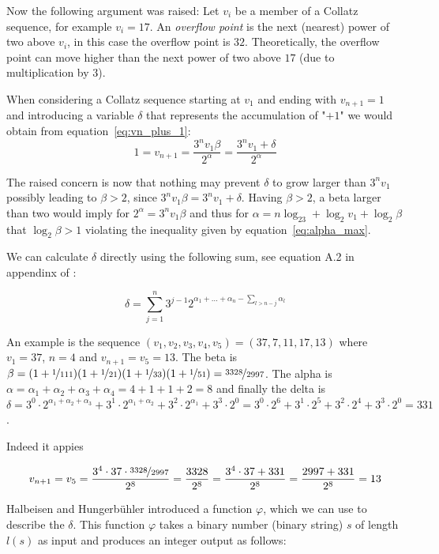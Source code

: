 \documentclass[12pt]{amsart}
\theoremstyle{definition}
\begin{document}
Now the following argument was raised: Let $v_i$ be a member of a Collatz sequence, for example $v_i=17$. An \textit{overflow point} is the next (nearest) power of two above $v_i$, in this case the overflow point is $32$. Theoretically, the overflow point can move higher than the next power of two above $17$ (due to multiplication by $3$).

When considering a Collatz sequence starting at $v_1$ and ending with $v_{n+1}=1$ and introducing a variable $\delta$ that represents the accumulation of "$+1$" we would obtain from equation~\ref{eq:vn_plus_1}:
\[
1=v_{n+1}=\frac{3^nv_1\beta}{2^{\alpha}}=\frac{3^nv_1+\delta}{2^{\alpha}}
\]

\par\medskip
The raised concern is now that nothing may prevent $\delta$ to grow larger than $3^nv_1$ possibly leading to $\beta>2$, since ${3^nv_1 \beta}={3^nv_1+\delta}$. Having $\beta>2$, a beta larger than two  would imply for $2^{\alpha}=3^nv_1\beta$ and thus for $\alpha=n\log_23+\log_2v_1+\log_2\beta$ that $\log_2\beta>1$ violating the inequality given by equation~\ref{eq:alpha_max}.

We can calculate $\delta$ directly using the following sum, see equation A.2 in appendinx of \cite[p.~36]{Sultanow_Koch_2020}:

\begin{equation}
\label{eq:delta}
\delta=\sum_{j=1}^{n}3^{j-1}2^{\alpha_1+\ldots+\alpha_n-\sum_{l>n-j}\alpha_l}
\end{equation}

An example is the sequence $(v_1,v_2,v_3,v_4,v_5)=(37,7,11,17,13)$ where $v_1=37$, $n=4$ and $v_{n+1}=v_5=13$. The beta is $\beta=(1+\nicefrac{1}{111})(1+\nicefrac{1}{21})(1+\nicefrac{1}{33})(1+\nicefrac{1}{51})=\nicefrac{3328}{2997}$. The alpha is $\alpha=\alpha_1+\alpha_2+\alpha_3+\alpha_4=4+1+1+2=8$ and finally the delta is $\delta=3^0\cdot2^{\alpha_1+\alpha_2+\alpha_3}+3^1\cdot2^{\alpha_1+\alpha_2}+3^2\cdot2^{\alpha_1}+3^3\cdot2^0=3^0\cdot2^6+3^1\cdot2^5+3^2\cdot2^4+3^3\cdot2^0=331$.

\par\medskip
Indeed it appies

\[
v_{n+1}=v_5=\frac{3^4\cdot37\cdot\nicefrac{3328}{2997}}{2^8}=\frac{3328}{2^8}=\frac{3^4\cdot37+331}{2^8}=\frac{2997+331}{2^8}=13
\]

Halbeisen and Hungerbühler \cite{Halbeisen_Hungerbuehler_1997} introduced a function $\varphi$, which we can use to describe the $\delta$. This function $\varphi$ takes a binary number (binary string) $s$ of length $l(s)$ as input and produces an integer output as follows:
\end{document}

